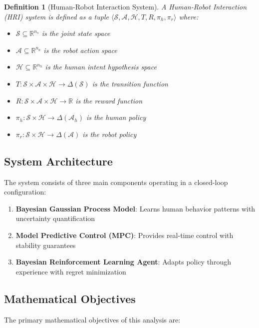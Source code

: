 \documentclass[11pt,twoside]{article}
\newtheorem{definition}[theorem]{Definition}
\newcommand{\R}{\mathbb{R}}
\begin{document}
\begin{definition}[Human-Robot Interaction System]
A Human-Robot Interaction (HRI) system is defined as a tuple $\langle \mathcal{S}, \mathcal{A}, \mathcal{H}, T, R, \pi_h, \pi_r \rangle$ where:
\begin{itemize}
    \item $\mathcal{S} \subseteq \R^{n_s}$ is the joint state space
    \item $\mathcal{A} \subseteq \R^{n_a}$ is the robot action space  
    \item $\mathcal{H} \subseteq \R^{n_h}$ is the human intent hypothesis space
    \item $T: \mathcal{S} \times \mathcal{A} \times \mathcal{H} \rightarrow \Delta(\mathcal{S})$ is the transition function
    \item $R: \mathcal{S} \times \mathcal{A} \times \mathcal{H} \rightarrow \R$ is the reward function
    \item $\pi_h: \mathcal{S} \times \mathcal{H} \rightarrow \Delta(\mathcal{A}_h)$ is the human policy
    \item $\pi_r: \mathcal{S} \times \mathcal{H} \rightarrow \Delta(\mathcal{A})$ is the robot policy
\end{itemize}
\end{definition}

\subsection{System Architecture}

The system consists of three main components operating in a closed-loop configuration:

\begin{enumerate}
    \item \textbf{Bayesian Gaussian Process Model}: Learns human behavior patterns with uncertainty quantification
    \item \textbf{Model Predictive Control (MPC)}: Provides real-time control with stability guarantees
    \item \textbf{Bayesian Reinforcement Learning Agent}: Adapts policy through experience with regret minimization
\end{enumerate}

\subsection{Mathematical Objectives}

The primary mathematical objectives of this analysis are:
\end{document}
